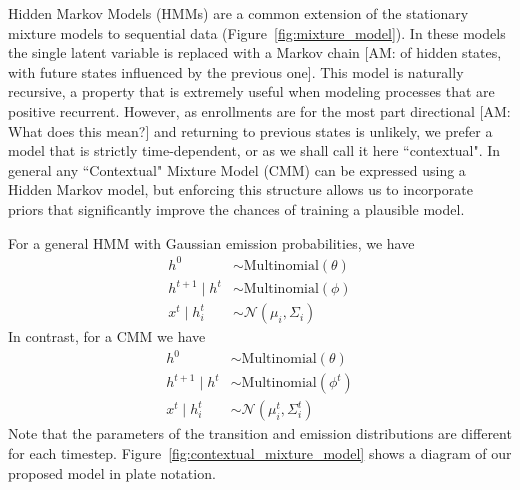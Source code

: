 \documentclass{edm_template}
\providecommand{\am}[1]{{\color{blue} [AM: #1]}}
\begin{document}
Hidden Markov Models (HMMs) are a common extension of the stationary mixture models to sequential data (Figure~\ref{fig:mixture_model}). In these models the single latent variable is replaced with a Markov chain \am{of hidden states, with future states influenced by the previous one}. This model is naturally recursive, a property that is extremely useful when modeling processes that are positive recurrent. However, as enrollments are for the most part directional \am{What does this mean?} and returning to previous states is unlikely, we prefer a model that is strictly time-dependent, or as we shall call it here ``contextual". In general any ``Contextual" Mixture Model (CMM) can be expressed using a Hidden Markov model, but enforcing this structure allows us to incorporate priors that significantly improve the chances of training a plausible model.

For a general HMM with Gaussian emission probabilities, we have 
\begin{align*}
h^0 &\sim \text{Multinomial}(\theta) \\    
h^{t+1} \mid h^{t} &\sim \text{Multinomial}(\phi) \\
x^{t} \mid h_i^{t} &\sim \mathcal{N}(\mu_i, \Sigma_i)
\end{align*}
In contrast, for a CMM we have 
\begin{align*}
h^0 &\sim \text{Multinomial}(\theta) \\    
h^{t+1} \mid h^{t} &\sim \text{Multinomial}(\phi^t) \\
x^{t} \mid h_i^{t} &\sim \mathcal{N}(\mu^t_i, \Sigma^t_i)
\end{align*}
Note that the parameters of the transition and emission distributions are different for each timestep. Figure~\ref{fig:contextual_mixture_model} shows a diagram of our proposed model in plate notation.
\end{document}
